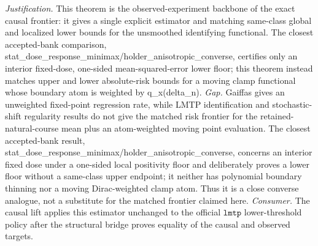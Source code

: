 \documentclass{article}
\begin{document}
\par\smallskip\noindent \textit{Justification.} This theorem is the observed-experiment backbone of the exact causal frontier: it gives a single explicit estimator and matching same-class global and localized lower bounds for the unsmoothed identifying functional. The closest accepted-bank comparison, stat\_dose\_response\_minimax/holder\_anisotropic\_converse, certifies only an interior fixed-dose, one-sided mean-squared-error lower floor; this theorem instead matches upper and lower absolute-risk bounds for a moving clamp functional whose boundary atom is weighted by q\_x(delta\_n). \textit{Gap.} Gaiffas gives an unweighted fixed-point regression rate, while LMTP identification and stochastic-shift regularity results do not give the matched risk frontier for the retained-natural-course mean plus an atom-weighted moving point evaluation. The closest accepted-bank result, stat\_dose\_response\_minimax/holder\_anisotropic\_converse, concerns an interior fixed dose under a one-sided local positivity floor and deliberately proves a lower floor without a same-class upper endpoint; it neither has polynomial boundary thinning nor a moving Dirac-weighted clamp atom. Thus it is a close converse analogue, not a substitute for the matched frontier claimed here. \textit{Consumer.} The causal lift applies this estimator unchanged to the official \(\texttt{lmtp}\) lower-threshold policy after the structural bridge proves equality of the causal and observed targets.
\end{document}
